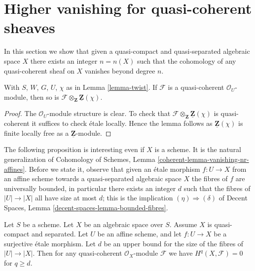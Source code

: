 \section{Higher vanishing for quasi-coherent sheaves}
\label{section-higher-vanishing}

\noindent
In this section we show that given a quasi-compact and
quasi-separated algebraic space $X$ there exists an integer
$n = n(X)$ such that the cohomology of any quasi-coherent
sheaf on $X$ vanishes beyond degree $n$.

\begin{lemma}
\label{lemma-quasi-coherent-twist}
With $S$, $W$, $G$, $U$, $\chi$ as in
Lemma \ref{lemma-twist}.
If $\mathcal{F}$ is a quasi-coherent $\mathcal{O}_U$-module,
then so is $\mathcal{F} \otimes_{\mathbf{Z}} \underline{\mathbf{Z}}(\chi)$.
\end{lemma}

\begin{proof}
The $\mathcal{O}_U$-module structure is clear. To check that
$\mathcal{F} \otimes_{\mathbf{Z}} \underline{\mathbf{Z}}(\chi)$
is quasi-coherent it suffices to check \'etale locally.
Hence the lemma follows as $\underline{\mathbf{Z}}(\chi)$
is finite locally free as a $\underline{\mathbf{Z}}$-module.
\end{proof}

\noindent
The following proposition is interesting even if $X$ is a scheme.
It is the natural generalization of
Cohomology of Schemes, Lemma \ref{coherent-lemma-vanishing-nr-affines}.
Before we state it, observe that given an \'etale morphism
$f : U \to X$ from an affine scheme towards a quasi-separated algebraic
space $X$ the fibres of $f$ are universally bounded, in particular
there exists an integer $d$ such that the fibres of $|U| \to |X|$
all have size at most $d$; this is the implication
$(\eta) \Rightarrow (\delta)$ of
Decent Spaces, Lemma \ref{decent-spaces-lemma-bounded-fibres}.

\begin{proposition}
\label{proposition-vanishing}
Let $S$ be a scheme. Let $X$ be an algebraic space over $S$.
Assume $X$ is quasi-compact and separated.
Let $U$ be an affine scheme, and let
$f : U \to X$ be a surjective \'etale morphism.
Let $d$ be an upper bound for the size of the fibres of
$|U| \to |X|$. Then for any quasi-coherent $\mathcal{O}_X$-module $\mathcal{F}$
we have $H^q(X, \mathcal{F}) = 0$ for $q \geq d$.
\end{proposition}

